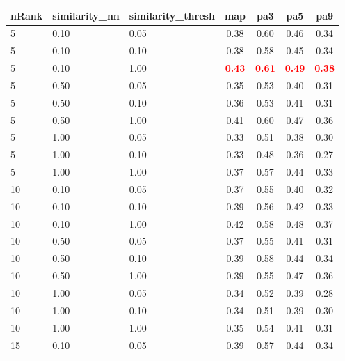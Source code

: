 \documentclass[12pt,a4paper,fleqn]{tufte-handout}
\begin{document}
 
\begin{table}                      
\begin{center}                      
\scriptsize                      
\setlength{\tabcolsep}{.16667em}                      
\begin{tabular}{lllcccc}                      
nRank & similarity\_nn & similarity\_thresh & map & pa3 & pa5 & pa9 \\                      
\hline                      
5 & 0.10 & 0.05 & 0.38 & 0.60 & 0.46 & 0.34 \\                      
5 & 0.10 & 0.10 & 0.38 & 0.58 & 0.45 & 0.34 \\                      
5 & 0.10 & 1.00 & \textbf{\textcolor{red}{0.43}} & \textbf{\textcolor{red}{0.61}} & \textbf{\textcolor{red}{0.49}} & \textbf{\textcolor{red}{0.38}} \\                      
5 & 0.50 & 0.05 & 0.35 & 0.53 & 0.40 & 0.31 \\                      
5 & 0.50 & 0.10 & 0.36 & 0.53 & 0.41 & 0.31 \\                      
5 & 0.50 & 1.00 & 0.41 & 0.60 & 0.47 & 0.36 \\                      
5 & 1.00 & 0.05 & 0.33 & 0.51 & 0.38 & 0.30 \\                      
5 & 1.00 & 0.10 & 0.33 & 0.48 & 0.36 & 0.27 \\                      
5 & 1.00 & 1.00 & 0.37 & 0.57 & 0.44 & 0.33 \\                      
10 & 0.10 & 0.05 & 0.37 & 0.55 & 0.40 & 0.32 \\                      
10 & 0.10 & 0.10 & 0.39 & 0.56 & 0.42 & 0.33 \\                      
10 & 0.10 & 1.00 & 0.42 & 0.58 & 0.48 & 0.37 \\                      
10 & 0.50 & 0.05 & 0.37 & 0.55 & 0.41 & 0.31 \\                      
10 & 0.50 & 0.10 & 0.39 & 0.58 & 0.44 & 0.34 \\                      
10 & 0.50 & 1.00 & 0.39 & 0.55 & 0.47 & 0.36 \\                      
10 & 1.00 & 0.05 & 0.34 & 0.52 & 0.39 & 0.28 \\                      
10 & 1.00 & 0.10 & 0.34 & 0.51 & 0.39 & 0.30 \\                      
10 & 1.00 & 1.00 & 0.35 & 0.54 & 0.41 & 0.31 \\                      
15 & 0.10 & 0.05 & 0.39 & 0.57 & 0.44 & 0.34 \\                      

\end{tabular}
\end{center}
\end{table}
\end{document}
